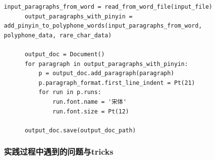 \documentclass[12pt,hyperref,a4paper,UTF8]{ctexart}
\begin{document}
\begin{enumerate}
\begin{lstlisting}[caption={注音处理与文件保存实现代码}, label={lst:example}]
      input_paragraphs_from_word = read_from_word_file(input_file)
      output_paragraphs_with_pinyin = add_pinyin_to_polyphone_words(input_paragraphs_from_word, polyphone_data, rare_char_data)
  
      output_doc = Document()
      for paragraph in output_paragraphs_with_pinyin:
          p = output_doc.add_paragraph(paragraph)
          p.paragraph_format.first_line_indent = Pt(21)
          for run in p.runs:
              run.font.name = '宋体'
              run.font.size = Pt(12)
  
      output_doc.save(output_doc_path)
  \end{lstlisting}
\end{enumerate}
\subsubsection{实践过程中遇到的问题与tricks}
\end{document}
